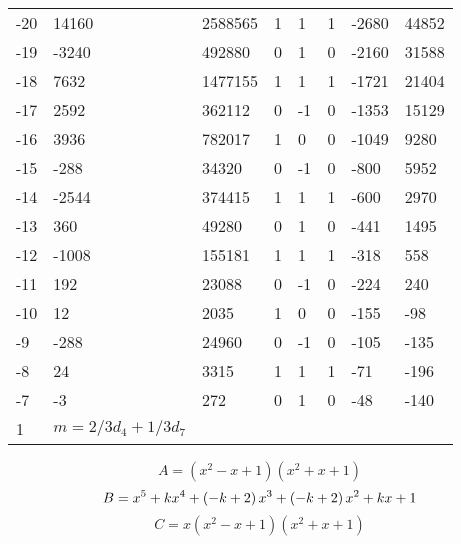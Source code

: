 \documentclass{amsart}
\begin{document}
\begin{longtable}{|l|l|l|lllll|}
-20&14160&2588565&1&1&1&-2680&44852\\
-19&-3240&492880&0&1&0&-2160&31588\\
-18&7632&1477155&1&1&1&-1721&21404\\
-17&2592&362112&0&-1&0&-1353&15129\\
-16&3936&782017&1&0&0&-1049&9280\\
-15&-288&34320&0&-1&0&-800&5952\\
-14&-2544&374415&1&1&1&-600&2970\\
-13&360&49280&0&1&0&-441&1495\\
-12&-1008&155181&1&1&1&-318&558\\
-11&192&23088&0&-1&0&-224&240\\
-10&12&2035&1&0&0&-155&-98\\
-9&-288&24960&0&-1&0&-105&-135\\
-8&24&3315&1&1&1&-71&-196\\
-7&-3&272&0&1&0&-48&-140\\
1&$m=2/3d_{4}+1/3d_{7}$&&\multicolumn{5}{c|}{}\\
\hline
\end{longtable}
$$A=(x^2
 - x
 + 1)(x^2
 + x
 + 1)$$
$$B=x^5
 + k\*x^4
 + \left(-k
 + 2\right) \*x^3
 + \left(-k
 + 2\right) \*x^2
 + k\*x
 + 1$$
$$C=x(x^2
 - x
 + 1)(x^2
 + x
 + 1)$$
\end{document}
